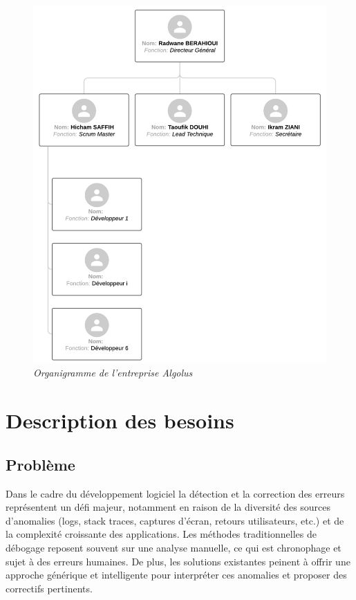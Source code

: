 \documentclass[12pt,a4paper]{report}
\begin{document}
	\begin{figure}[H]
		\centering
		\includegraphics[width=1\textwidth]{algolus-organigramme.png}
		\caption{\textit{Organigramme de l'entreprise Algolus}}
		\label{fig:algolus-organigramme}
	\end{figure}
	
	\section{Description des besoins}
	
	\subsection{Problème}
	
	Dans le cadre du développement logiciel la détection et la correction des erreurs représentent un défi majeur, notamment en raison de la diversité des sources d’anomalies (logs, stack traces, captures d’écran, retours utilisateurs, etc.) et de la complexité croissante des applications. Les méthodes traditionnelles de débogage reposent souvent sur une analyse manuelle, ce qui est chronophage et sujet à des erreurs humaines. De plus, les solutions existantes peinent à offrir une approche générique et intelligente pour interpréter ces anomalies et proposer des correctifs pertinents.
	
\end{document}
